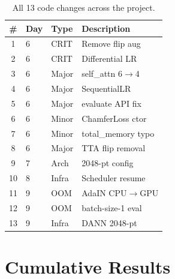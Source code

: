 \documentclass[10pt,twocolumn,letterpaper]{article}
\begin{document}
\begin{table}[h]
\centering
\scriptsize
\begin{tabular}{@{}clll@{}}
\toprule
\textbf{\#} & \textbf{Day} & \textbf{Type} & \textbf{Description} \\
\midrule
1 & 6 & \textcolor{bugred}{CRIT} & Remove flip aug \\
2 & 6 & \textcolor{bugred}{CRIT} & Differential LR \\
3 & 6 & Major & self\_attn 6$\to$4 \\
4 & 6 & Major & SequentialLR \\
5 & 6 & Major & evaluate API fix \\
6 & 6 & Minor & ChamferLoss ctor \\
7 & 6 & Minor & total\_memory typo \\
8 & 6 & Major & TTA flip removal \\
9 & 7 & Arch & 2048-pt config \\
10 & 8 & Infra & Scheduler resume \\
11 & 9 & OOM & AdaIN CPU$\to$GPU \\
12 & 9 & OOM & batch-size-1 eval \\
13 & 9 & Infra & DANN 2048-pt \\
\bottomrule
\end{tabular}
\caption{All 13 code changes across the project.}
\end{table}

\section{Cumulative Results}
\end{document}
